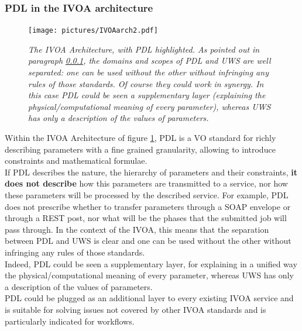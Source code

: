 \documentclass[a4paper,11pt] {ivoa}
\begin{document}
\subsubsection{PDL in the IVOA architecture}\label{IVOAarch}
\begin{figure}[htbp]
\begin{center}
\texttt{[image: pictures/IVOAarch2.pdf]} 
\caption{{\it The IVOA Architecture, with PDL highlighted. As pointed out in paragraph \ref{IVOAarch}, the domains and scopes of PDL and UWS are well separated: one can be used without the other without infringing any rules of those  standards. Of course they could work in synergy. In this case PDL could be seen a supplementary layer (explaining the physical/computational meaning of every parameter), whereas UWS has only a description of the values of parameters.}}
\label{Pic-arch}
\end{center}
\end{figure}
Within the IVOA Architecture of figure \ref{Pic-arch}, PDL is a VO standard for richly describing parameters with a fine grained granularity, allowing to introduce constraints and mathematical formulae.\\
If PDL describes the nature, the hierarchy of parameters and their constraints, {\bf it  does not describe} how this parameters are transmitted to a service, nor how these parameters will be processed by the described service. For example, PDL does not prescribe whether to transfer parameters through a SOAP envelope or through a REST post, nor what will be the  phases that the submitted job will pass through. In the context of the IVOA, this means that the separation between PDL and UWS is clear and one can be used without the other without infringing any rules of those  standards.\\
Indeed, PDL could be seen a supplementary layer, for explaining in a unified way the physical/computational meaning of every parameter, whereas UWS has only a description of the values of parameters. \\
PDL could be plugged as an additional layer to every existing IVOA service and is suitable for solving issues not covered by other IVOA standards and is particularly indicated for workflows.
\end{document}
